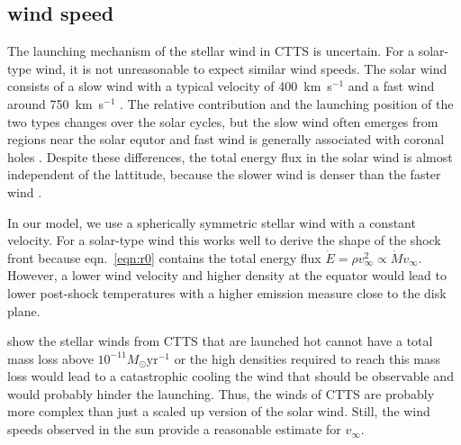 \subsection{wind speed}
The launching mechanism of the stellar wind in CTTS is uncertain. For a solar-type wind, it is not unreasonable to expect similar wind speeds. The solar wind consists of a slow wind with a typical velocity of 400~km~s$^{-1}$ and a fast wind around 750~km~s$^{-1}$ \citep{adsabs.harvard.edu/abs/2005JGRA..11007109F}. The relative contribution and the launching position of the two types changes over the solar cycles, but the slow wind often emerges from regions near the solar equtor and fast wind is generally associated with coronal holes \citep{1999GeoRL..26.2901G,2003A&A...408.1165B,2009LRSP....6....3C}. Despite these differences, the total energy flux in the solar wind is almost independent of the lattitude, because the slower wind is denser than the faster wind \citep{2012SoPh..279..197L}. 

In our model, we use a spherically symmetric stellar wind with a constant velocity. For a solar-type wind this works well to derive the shape of the shock front because eqn.~\ref{eqn:r0} contains the total energy flux $\dot E = \rho v^2_\infty \propto \dot M v_\infty$. However, a lower wind velocity and higher density at the equator would lead to lower post-shock temperatures with a higher emission measure close to the disk plane.

\citet{2007IAUS..243..299M} show the stellar winds from CTTS that are launched hot cannot have a total mass loss above $10^{-11}M_\odot\mathrm{ yr}^{-1}$ or the high densities required to reach this mass loss would lead to a catastrophic cooling the wind that should be observable and would probably hinder the launching. Thus, the winds of CTTS are probably more complex than just a scaled up version of the solar wind. Still, the wind speeds observed in the sun provide a reasonable estimate for $v_\infty$.